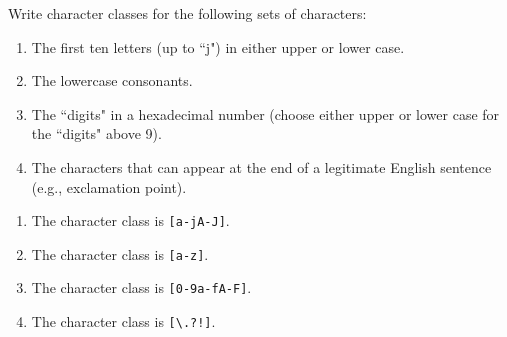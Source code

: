 \begin{exercise}\label{ex:030306}
    Write character classes for the following sets of characters:
    \begin{enumerate}[label=\alph*)]
        \item The first ten letters (up to ``j") in either upper or lower case.
        \item The lowercase consonants.
        \item The ``digits" in a hexadecimal number (choose either upper or 
        lower case for the ``digits" above 9).
        \item The characters that can appear at the end of a legitimate English 
        sentence (e.g., exclamation point).
    \end{enumerate}
\end{exercise}
\begin{solution}\label{sol:030306}
    \begin{enumerate}[label=\alph*)]
        \item The character class is \texttt{[a-jA-J]}.
        \item The character class is \texttt{[a-z]}.
        \item The character class is \texttt{[0-9a-fA-F]}.
        \item The character class is \texttt{[\textbackslash.?!]}.
    \end{enumerate}
\end{solution}